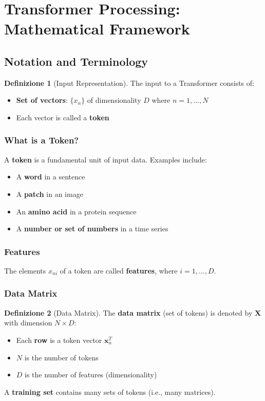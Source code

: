 \documentclass[11pt,a4paper]{article}
\theoremstyle{definition}
\newtheorem{definition}{Definizione}[section]
\theoremstyle{plain}
\theoremstyle{remark}
\begin{document}
\section{Transformer Processing: Mathematical Framework}

\subsection{Notation and Terminology}

\begin{definition}[Input Representation]
The input to a Transformer consists of:
\begin{itemize}
    \item \textbf{Set of vectors}: $\{x_n\}$ of dimensionality $D$ where $n = 1, \ldots, N$
    \item Each vector is called a \textbf{token}
\end{itemize}
\end{definition}

\subsubsection{What is a Token?}

A \textbf{token} is a fundamental unit of input data. Examples include:
\begin{itemize}
    \item A \textbf{word} in a sentence
    \item A \textbf{patch} in an image
    \item An \textbf{amino acid} in a protein sequence
    \item A \textbf{number or set of numbers} in a time series
\end{itemize}

\subsubsection{Features}

The elements $x_{ni}$ of a token are called \textbf{features}, where $i = 1, \ldots, D$.

\subsubsection{Data Matrix}

\begin{definition}[Data Matrix]
The \textbf{data matrix} (set of tokens) is denoted by $\mathbf{X}$ with dimension $N \times D$:
\begin{itemize}
    \item Each \textbf{row} is a token vector $\mathbf{x}_n^T$
    \item $N$ is the number of tokens
    \item $D$ is the number of features (dimensionality)
\end{itemize}

A \textbf{training set} contains many sets of tokens (i.e., many matrices).
\end{definition}
\end{document}
